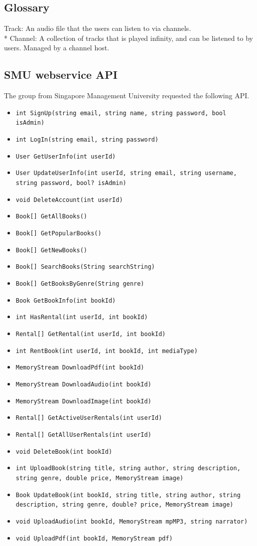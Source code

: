 \documentclass[a4paper,11pt,report]{article}
\begin{document}
\subsection{Glossary}
Track: An audio file that the users can listen to via channels. \\*
Channel: A collection of tracks that is played infinity, and can be listened to by users. Managed by a channel host.
\subsection{SMU webservice API}
The group from Singapore Management University requested the following API.
\begin{itemize}
	\item \texttt{int SignUp(string email, string name, string password, bool isAdmin)}
	\item \texttt{int LogIn(string email, string password)}
	\item \texttt{User GetUserInfo(int userId)}
	\item \texttt{User UpdateUserInfo(int userId, string email, string username, string password, bool? isAdmin)}
	\item \texttt{void DeleteAccount(int userId)}
	\item \texttt{Book[] GetAllBooks()}
	\item \texttt{Book[] GetPopularBooks()}
	\item \texttt{Book[] GetNewBooks()}
	\item \texttt{Book[] SearchBooks(String searchString)}
	\item \texttt{Book[] GetBooksByGenre(String genre)}
	\item \texttt{Book GetBookInfo(int bookId)}
	\item \texttt{int HasRental(int userId, int bookId)}
	\item \texttt{Rental[] GetRental(int userId, int bookId)}
	\item \texttt{int RentBook(int userId, int bookId, int mediaType)}
	\item \texttt{MemoryStream DownloadPdf(int bookId)}
	\item \texttt{MemoryStream DownloadAudio(int bookId)}
	\item \texttt{MemoryStream DownloadImage(int bookId)}
	\item \texttt{Rental[] GetActiveUserRentals(int userId)}
	\item \texttt{Rental[] GetAllUserRentals(int userId)}
	\item \texttt{void DeleteBook(int bookId)}
	\item \texttt{int UploadBook(string title, string author, string description, string genre, double price, MemoryStream image)}
	\item \texttt{Book UpdateBook(int bookId, string title, string author, string description, string genre, double? price, MemoryStream image)}
	\item \texttt{void UploadAudio(int bookId, MemoryStream mpMP3, string narrator)}
	\item \texttt{void UploadPdf(int bookId, MemoryStream pdf)}
\end{itemize}
\end{document}
